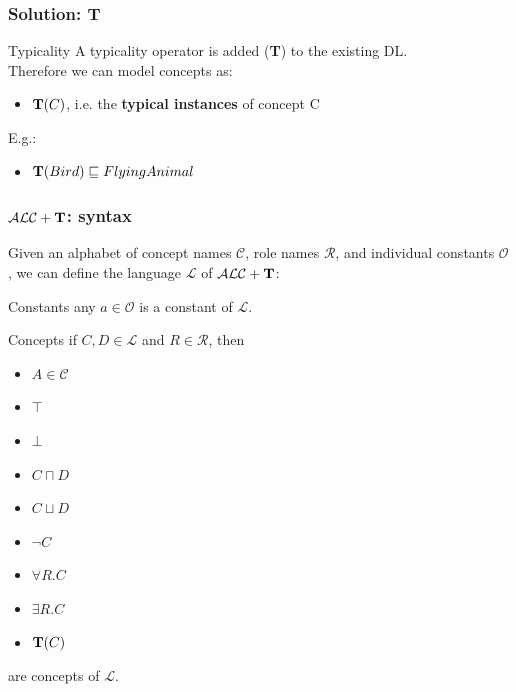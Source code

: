 \documentclass[serif,mathserif]{beamer}
\newcommand{\tip}{{\bf T}}
\newcommand{\alct}{\mathcal{ALC}+\tip}
\begin{document}
\begin{frame}
	\frametitle{Solution: \tip}
	
	\begin{block}{Typicality}
	A typicality operator is added (\tip) to the existing DL.\\
	Therefore we can model concepts as:
	\begin{itemize}
	\item $\tip(C)$, i.e. the \textbf{typical instances} of concept C\\
	\end{itemize}
	\end{block}
	
	E.g.:
	\begin{itemize}
	\item $\tip(Bird) \sqsubseteq FlyingAnimal$
	\end{itemize}
\end{frame}

\begin{frame}
	\frametitle{$\alct$: syntax}
	
	\small
	Given an alphabet of concept names $\mathcal{C}$, role names $\mathcal{R}$, and individual constants $\mathcal{O}$, we can define the language $\mathcal{L}$ of $\alct$:
	
	\normalsize
	\begin{block}{Constants}
	any $a \in \mathcal{O}$ is a constant of $\mathcal{L}$.
	\end{block}
	\begin{block}{Concepts}
	if $C, D \in \mathcal{L}$ and $R \in \mathcal{R}$, then
	\begin{multicols}{2}
		\begin{itemize}
		\item $A \in \mathcal{C}$
		\item $\top$
		\item $\bot$
		\item $C\sqcap D$
		\item $C \sqcup D$
		\item $\neg C$
		\item $\forall R.C$
		\item $\exists R.C$
		\item \alert{$\tip(C)$}
		\end{itemize}
	\end{multicols}
	are concepts of $\mathcal{L}$.
	\end{block}
\end{frame}
\end{document}
